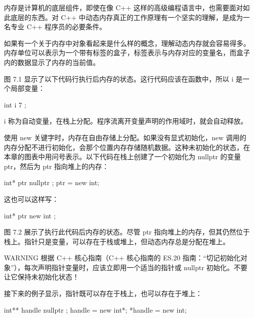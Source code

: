
内存是计算机的底层组件，即使在像 C++ 这样的高级编程语言中，也需要面对如此底层的东西。对 C++ 中动态内存真正的工作原理有一个坚实的理解，是成为一名专业 C++ 程序员的必要条件。


如果有一个关于内存中对象看起来是什么样的概念，理解动态内存就会容易得多。内存单位可以表示为一个带有标签的盒子，标签表示与内存对应的变量名，而盒子内的数据显示了内存的当前值。

图 7.1 显示了以下代码行执行后内存的状态。这行代码应该在函数中，所以 i 是一个局部变量：

\begin{cpp}
int i { 7 };
\end{cpp}


i 称为自动变量，在栈上分配。程序流离开变量声明的作用域时，就会自动释放。

使用 new 关键字时，内存在自由存储上分配。如果没有显式初始化，new 调用的内存分配不进行初始化，会那个位置内存存储随机数据。这种未初始化的状态，在本章的图表中用问号表示。以下代码在栈上创建了一个初始化为 nullptr 的变量 ptr，然后为 ptr 指向堆上的内存：

\begin{cpp}
int* ptr { nullptr };
ptr = new int;
\end{cpp}

这也可以这样写：

\begin{cpp}
int* ptr { new int };
\end{cpp}


图 7.2 展示了执行此代码后内存的状态。尽管 ptr 指向堆上的内存，但其仍然位于栈上。指针只是变量，可以存在于栈或堆上，但动态内存总是分配在堆上。

\begin{myWarning}{WARNING}
根据 C++ 核心指南（C++ 核心指南的 ES.20 指南：“切记初始化对象”），每次声明指针变量时，应该立即用一个适当的指针或 nullptr 初始化。不要让它保持未初始化状态！
\end{myWarning}

接下来的例子显示，指针既可以存在于栈上，也可以存在于堆上：

\begin{cpp}
int** handle { nullptr };
handle = new int*;
*handle = new int;
\end{cpp}

